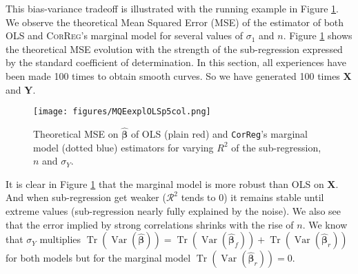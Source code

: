 \documentclass[12pt,a4paper]{report}
\begin{document}
	This bias-variance tradeoff is illustrated with the running example in Figure \ref{MQEexplOLSp5col}. We observe the theoretical Mean Squared Error (MSE) of the estimator of both OLS and \textsc{CorReg}'s marginal  model for several values of $\sigma_1$ and $n$. Figure \ref{MQEexplOLSp5col} shows the theoretical MSE evolution with the strength of the sub-regression expressed by the standard coefficient of determination. In this section, all experiences have been made 100 times to obtain smooth curves. So we have generated 100 times $\boldsymbol{X}$ and $\boldsymbol{Y}$.
\begin{figure}[h!]
	\texttt{[image: figures/MQEexplOLSp5col.png]}\label{MQEexplOLSp5col}
	\caption{Theoretical MSE on $\hat{\boldsymbol{\beta}}$ of OLS (plain red) and {\tt CorReg}'s marginal model (dotted blue) estimators for varying $R^2$ of the sub-regression, $n$ and $\sigma_Y$.}
\end{figure} 
It is clear in Figure \ref{MQEexplOLSp5col} that the marginal model is more robust than \textsc{OLS} on $\boldsymbol{X}$. And when sub-regression get weaker ($\mathcal{R}^2$ tends to 0) it remains stable until extreme values (sub-regression nearly fully explained by the noise). We also see that the error implied by strong correlations shrinks with the rise of $n$. 
We know that $\sigma_Y$ multiplies $\operatorname{Tr}(\operatorname{Var}(\hat{\boldsymbol{\beta}}))=\operatorname{Tr}(\operatorname{Var}(\hat{\boldsymbol{\beta}}_{f}))+\operatorname{Tr}(\operatorname{Var}(\hat{\boldsymbol{\beta}}_{r}))$ for both models but for the marginal model $\operatorname{Tr}(\operatorname{Var}(\hat{\boldsymbol{\beta}}_{r}))=0$. \\
\end{document}
